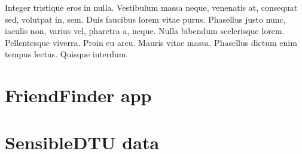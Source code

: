 Integer tristique eros in nulla. Vestibulum massa neque, venenatis at, consequat sed, volutpat in, 
sem. Duis faucibus lorem vitae purus. Phasellus justo nunc, iaculis non, varius vel, pharetra a, 
neque. Nulla bibendum scelerisque lorem. Pellentesque viverra. Proin eu arcu. Mauris vitae massa. 
Phasellus dictum enim tempus lectus. Quisque interdum.

\section{FriendFinder app}
\section{SensibleDTU data} 	